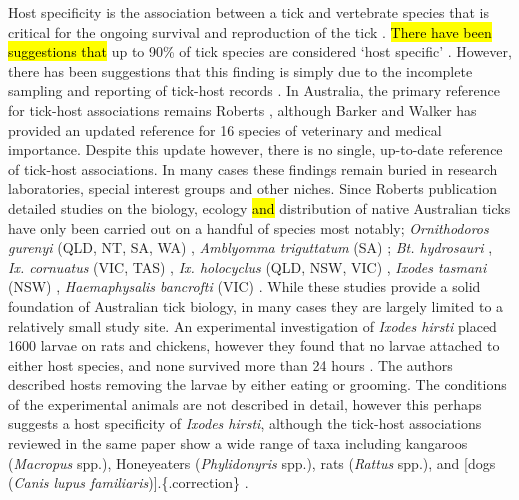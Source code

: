 \documentclass[a4paper, nobind]{templates/ociamthesis}
\begin{document}
Host specificity is the association between a tick and vertebrate species that is critical for the ongoing survival and reproduction of the tick \autocite{hoogstraalTickhostSpecificity1982}.
\hl{There have been suggestions that} up to 90\% of tick species are considered `host specific' \autocite{hoogstraalTickhostSpecificity1982}.
However, there has been suggestions that this finding is simply due to the incomplete sampling and reporting of tick-host records \autocite{klompenEvolutionTicks1996}.
In Australia, the primary reference for tick-host associations remains Roberts \autocite*{robertsAustralianTicks1970}, although Barker and Walker \autocite*{barkerTicksAustraliaSpecies2014} has provided an updated reference for 16 species of veterinary and medical importance.
Despite this update however, there is no single, up-to-date reference of tick-host associations.
In many cases these findings remain buried in research laboratories, special interest groups and other niches.
Since Roberts \autocite*{robertsAustralianTicks1970} publication detailed studies on the biology, ecology \hl{and} distribution of native Australian ticks have only been carried out on a handful of species most notably; \emph{Ornithodoros gurenyi} (QLD, NT, SA, WA) \autocite{doubeEcologyKangarooTick1972,doubeTwoRacesKangaroo1975}, \emph{Amblyomma triguttatum} (SA) \autocite{waudbySeasonalDensityFluctuations2007}; \emph{Bt. hydrosauri} \autocite{bullDispersalAustralianReptile1978,andrewsMatingBehaviourAustralian1980,belanHostDetectionFour1991,chiltonInterspecificDifferencesMicrohabitat1993}, \emph{Ix. cornuatus} (VIC, TAS) \autocite{jacksonGeneticVariationTicks2000,jacksonDistributionsParalysisTicks2007,songPhylogeneticPhylogeographicRelationships2011}, \emph{Ix. holocyclus} (QLD, NSW, VIC) \autocite{doubeSeasonalPatternsAbundance1979,jacksonGeneticVariationTicks2000,jacksonDistributionsParalysisTicks2007,songPhylogeneticPhylogeographicRelationships2011}, \emph{Ixodes tasmani} (NSW) \autocite{murdochEcologyCommonMarsupial2005}, \emph{Haemaphysalis bancrofti} (VIC) \autocite{laanOccuranceTickHaemaphysalis2011}.
While these studies provide a solid foundation of Australian tick biology, in many cases they are largely limited to a relatively small study site.
An experimental investigation of \emph{Ixodes hirsti} placed 1600 larvae on rats and chickens, however they found that no larvae attached to either host species, and none survived more than 24 hours \autocite{laanObservationsBiologyDistribution2011}.
The authors described hosts removing the larvae by either eating or grooming.
The conditions of the experimental animals are not described in detail, however this perhaps suggests a host specificity of \emph{Ixodes hirsti}, although the tick-host associations reviewed in the same paper show a wide range of taxa including kangaroos (\emph{Macropus} spp.), Honeyeaters (\emph{Phylidonyris} spp.), rats (\emph{Rattus} spp.), and {[}dogs (\emph{Canis lupus familiaris}){]}.\{.correction\} \autocite{laanObservationsBiologyDistribution2011}.
\end{document}
